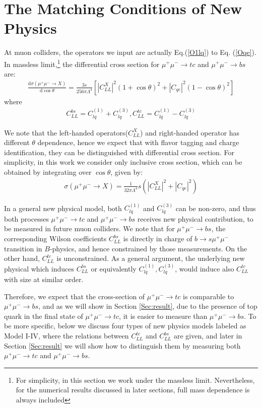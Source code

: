 \documentclass[a4paper,11pt]{article}
\newcommand{\ud}{\mathrm{d}}
\begin{document}
\section{The Matching Conditions of New Physics}
\label{Sec:NP}

At muon colliders, the operators we input are actually Eq.(\ref{O1lq}) to Eq. (\ref{Oqe}).
 In massless limit,\footnote{For simplicity, in this section we work under the massless limit. Nevertheless, for the numerical results discussed in later sections, full mass dependence is always included} the differential cross section for $\mu^+\mu^-\to tc$ and  $\mu^+\mu^-\to bs$ are:
 \begin{align}
     \frac{\ud\sigma(\mu^+\mu^-\to X)}{\ud\cos\theta}=\frac{3s}{256\pi \Lambda^4}\left[|C_{LL}^{X}|^2(1+\cos\theta)^2+|C_{qe}|^2(1-\cos\theta)^2\right]
 \end{align}
 where
 \begin{align}
 C_{LL}^{bs}=C_{lq}^{(1)}+C_{lq}^{(3)},C_{LL}^{tc}=C_{lq}^{(1)}-C_{lq}^{(3)}
 \end{align}

We note that the left-handed operators($C_{LL}^{X}$) and right-handed operator has different $\theta$ dependence, hence we expect that with flavor tagging and charge identification, they can be distinguished with differential cross section.
For simplicity, in this work we consider only inclusive cross section, which can be obtained by integrating over $\cos\theta$, given by:
\begin{align}
    \sigma(\mu^+\mu^-\to X)=\frac{1}{32\pi\Lambda^4}s(|C_{LL}^{X}|^2+|C_{qe}|^2)
\end{align}

In a general new physical model,
both $C_{lq}^{(1)}$ and $C_{lq}^{(3)}$ can be non-zero,
and thus both processes $\mu^+\mu^-\to tc$ and $\mu^+\mu^-\to bs$ receives new physical contribution,
to be measured in future muon colliders.
We note that for $\mu^+\mu^-\to bs$, the corresponding Wilson coefficients $C_{LL}^{bs}$ is directly in charge of $b\to s\mu^+\mu^-$ transition in $B$-physics,
and hence constrained by those measurements.
On the other hand, $C_{LL}^{tc}$ is unconstrained.
As a general argument, the underlying new physical which induces $C_{LL}^{bs}$ or equivalently $C_{lq}^{(1)},C_{lq}^{(3)}$,
would induce also $C_{LL}^{tc}$ with size at similar order.

Therefore, we expect that the cross-section of $\mu^+\mu^-\to tc$ is comparable to $\mu^+\mu^-\to bs$,
and as we will show in Section \ref{Sec:result}, due to the presence of top quark in the final state of $\mu^+\mu^-\to tc$,
it is easier to measure than $\mu^+\mu^-\to bs$.
To be more specific, below we discuss four types of new physics models labeled as Model I-IV, 
where the relations between $C_{LL}^{tc}$ and $C_{LL}^{bs}$ are given,
and later in Section \ref{Sec:result} we will show how to distinguish them by measuring both $\mu^+\mu^-\to tc$ and $\mu^+\mu^-\to bs$.
\end{document}
